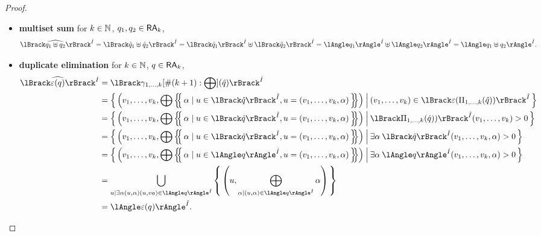 \begin{proof}
\begin{itemize}
		\item \textbf{multiset sum} for $k\in\mathbb{N}$, $q_1,q_2\in\mathsf{RA}_k$,
			\[\sem{\hat I}{\widehat{q_1\uplus q_2}}=\sem{\hat I}{\hat q_1\uplus
					\hat q_2}=\sem{\hat I}{\hat q_1}\uplus\sem{\hat I}{\hat q_2}=
				\ansem{\hat I}{q_1}\uplus\ansem{\hat I}{q_2}=\ansem{\hat I}{q_1\uplus
					q_2}.\]

		\item \textbf{duplicate elimination} for $k\in\mathbb{N}$,
			$q\in\mathsf{RA}_k$,\\
			\begin{align*}
				\sem{\hat I}{\widehat{\epsilon(q)}}
				 & =
				\sem{\hat I}{\gamma_{1,\dots,k}[\#(k+1):\bigoplus](\hat q)}                   \\
				 & =\set{\left(v_1,\dots,v_k,\bigoplus\mset{\alpha\mid u\in \sem{\hat I}{\hat
							q}, u=(v_1,\dots,v_k,\alpha)}\right)\:\middle|\: (v_1,\dots,v_k)\in \sem{\hat
				I}{\epsilon(\Pi_{1,\dots,k}(\hat q))}}                                        \\
				 & =\set{\left(v_1,\dots,v_k,\bigoplus\mset{\alpha\mid u\in \sem{\hat I}{\hat
							q}, u=(v_1,\dots,v_k,\alpha)}\right)\:\middle|\:
					\sem{\hat I}{\Pi_{1,\dots,k}(\hat
				q))}(v_1,\dots,v_k)>0}                                                        \\
				 & =\set{\left(v_1,\dots,v_k,\bigoplus\mset{\alpha\mid u\in \sem{\hat I}{\hat
							q}, u=(v_1,\dots,v_k,\alpha)}\right)\:\middle|\:
				\exists\alpha\: \sem{\hat I}{\hat q}(v_1,\dots,v_k,\alpha)>0}                 \\
				 & =\set{\left(v_1,\dots,v_k,\bigoplus\mset{\alpha\mid u\in \ansem{\hat I}{
							q}, u=(v_1,\dots,v_k,\alpha)}\right)\:\middle|\:
				\exists\alpha\: \ansem{\hat I}{q}(v_1,\dots,v_k,\alpha)>0}                    \\
				 & = \bigcup_{u\mid\exists \alpha(u,\alpha) (u,va)\in\ansem{\hat I}{q}}
				\set{\left(u,\bigoplus_{\alpha\mid (u,\alpha)\in \ansem{\hat
				I}{q}}\alpha\right)}                                                          \\
				 & =\ansem{\hat I}{\epsilon(q)}.
			\end{align*}


\end{itemize}
\end{proof}
